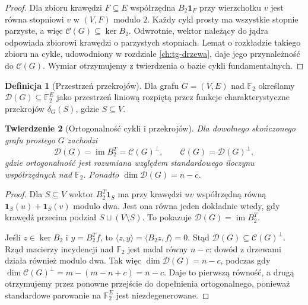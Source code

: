 \documentclass[11pt,a4paper]{report}
\numberwithin{equation}{section}
\theoremstyle{plain}
\newtheorem{twierdzenie}{Twierdzenie}[section]
\theoremstyle{definition}
\newtheorem{definicja}[twierdzenie]{Definicja}
\theoremstyle{remark}
\begin{document}
\begin{proof}
Dla zbioru krawędzi $F\subseteq E$ współrzędna
$B_2\mathbf1_F$ przy wierzchołku $v$ jest równa
stopniowi $v$ w $(V,F)$ modulo $2$.
Każdy cykl prosty ma wszystkie stopnie parzyste, a więc
$\mathcal C(G)\subseteq\ker B_2$.
Odwrotnie, wektor należący do jądra odpowiada zbiorowi
krawędzi o parzystych stopniach. Lemat o rozkładzie takiego
zbioru na cykle, udowodniony w rozdziale
\ref{ch:tg-drzewa}, daje jego przynależność do
$\mathcal C(G)$. Wymiar otrzymujemy z twierdzenia
o bazie cykli fundamentalnych.
\end{proof}

\begin{definicja}[Przestrzeń przekrojów]
Dla grafu $G=(V,E)$ nad $\mathbb F_2$ określamy
$\mathcal D(G)\subseteq\mathbb F_2^E$ jako przestrzeń
liniową rozpiętą przez funkcje charakterystyczne
przekrojów $\delta_G(S)$, gdzie $S\subseteq V$.
\end{definicja}

\begin{twierdzenie}[Ortogonalność cykli i przekrojów]
\label{thm:tg-orthogonal}
Dla dowolnego skończonego grafu prostego $G$ zachodzi
\[
\mathcal D(G)=\operatorname{im}B_2^T
  =\mathcal C(G)^\perp,\qquad
\mathcal C(G)=\mathcal D(G)^\perp,
\]
gdzie ortogonalność jest rozumiana względem
standardowego iloczynu współrzędnych nad $\mathbb F_2$.
Ponadto $\dim\mathcal D(G)=n-c$.
\end{twierdzenie}

\begin{proof}
Dla $S\subseteq V$ wektor $B_2^T\mathbf1_S$
ma przy krawędzi $uv$ współrzędną równą
$\mathbf1_S(u)+\mathbf1_S(v)$ modulo dwa. Jest ona równa
jeden dokładnie wtedy, gdy krawędź przecina podział
$S\sqcup(V\setminus S)$. To pokazuje
$\mathcal D(G)=\operatorname{im}B_2^T$.

Jeśli $z\in\ker B_2$ i $y=B_2^Tf$, to
$\langle z,y\rangle=\langle B_2z,f\rangle=0$.
Stąd $\mathcal D(G)\subseteq\mathcal C(G)^\perp$.
Rząd macierzy incydencji nad $\mathbb F_2$ jest nadal
równy $n-c$: dowód z drzewami działa również modulo dwa.
Tak więc $\dim\mathcal D(G)=n-c$, podczas gdy
$\dim\mathcal C(G)^\perp=m-(m-n+c)=n-c$.
Daje to pierwszą równość, a drugą otrzymujemy przez
ponowne przejście do dopełnienia ortogonalnego,
ponieważ standardowe parowanie na $\mathbb F_2^E$
jest niezdegenerowane.
\end{proof}
\end{document}
